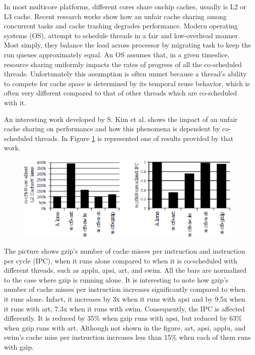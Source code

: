 In most multicore platforms, different cores share onchip caches, usually is L2 or L3 cache. Recent research works show how an unfair cache sharing
among concurrent tasks and cache trashing degrades performance. Modern operating systems (OS), attempt to schedule threads in a
fair and low-overhead manner.
Most simply, they balance the load across processor by migrating task to keep the run queues approximately equal. An OS assumes that,
in a given timeslice, resource sharing uniformly impacts the rates of progress of all the co-scheduled threads.
Unfortunately this assumption is often unmet because a thread's ability to compete for cache space is determined by its temporal reuse behavior,
which is often very different compared to that of other threads which are co-scheduled with it.

An interesting work developed by S. Kim et al. shows the impact of an unfair cache sharing on performance and how this phenomena is dependent by
co-scheduled threads. In Figure \ref{fig:gzip_miss} is represented one of results provided by that work.

\begin{figure}[htbp]
\centering
\includegraphics[width=\widefigure]{images/chandra_gzip}
\caption{}
\label{fig:gzip_miss}
\end{figure}

The picture shows gzip's number of cache misses per instruction and instruction per cycle (IPC), when it runs alone compared to when it is
co-scheduled with different threads, such as applu, apsi, art, and swim. All the bars are normalized to the case where gzip is running alone.
It is interesting to note how gzip's number of cache misses per instruction increases significantly compared to when it runs alone. Infact, it increases 
by 3x when it runs with apsi and by 9.5x when it runs with art, 7.3x when it runs with swim.
Consequently, the IPC is affected differently. It is reduced by 35$\%$ when gzip runs with apsi, but reduced by 63$\%$ when gzip runs with art. 
Although not shown in the figure, art, apsi, applu, and swim's cache miss per instruction increases less than 15$\%$ when each of them runs with gzip. 

